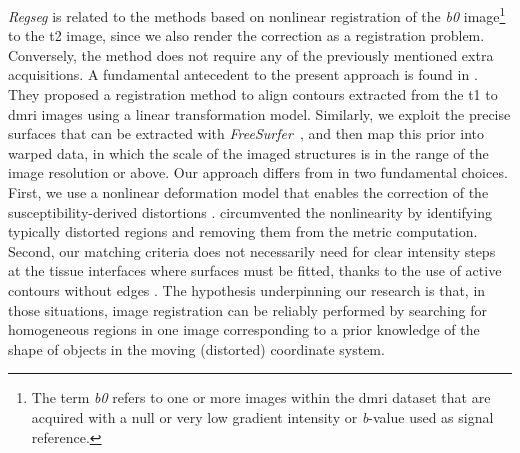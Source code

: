 \emph{Regseg} is related to the methods based on nonlinear registration of the \emph{b0}
  image\footnote{The term \emph{b0} refers to one or more images within the
  \gls*{dmri} dataset that are acquired with a null or very low gradient intensity or
   \emph{b}-value used as signal reference.}
  to the \gls*{t2} image, since we also render the correction as a
  registration problem.
Conversely, the method does not require any of the previously mentioned extra acquisitions.
A fundamental antecedent to the present approach is found in \citep{greve_accurate_2009}.
They proposed a registration method to align contours extracted from the \gls*{t1}
  to \gls*{dmri} images using a linear transformation model.
Similarly, we exploit the precise surfaces that can be extracted with
  \emph{FreeSurfer}~\citep{fischl_freesurfer_2012},
  and then map this prior into warped data, in which the scale of the
  imaged structures is in the range of the image resolution or above.
Our approach differs from \citep{greve_accurate_2009} in two fundamental choices.
First, we use a nonlinear deformation model that enables the correction of the
  susceptibility-derived distortions \citep{jezzard_correction_1995}.
\cite{greve_accurate_2009} circumvented the nonlinearity by identifying typically
  distorted regions and removing them from the metric computation.
Second, our matching criteria does not necessarily need for clear intensity
  steps at the tissue interfaces where surfaces must be fitted, thanks to the use of
  active contours without edges \citep{chan_active_2001}.
The hypothesis underpinning our research is that, in those situations,
  image registration can be reliably performed by searching for homogeneous
  regions in one image corresponding to a prior knowledge of the shape of objects in
  the moving (distorted) coordinate system.
